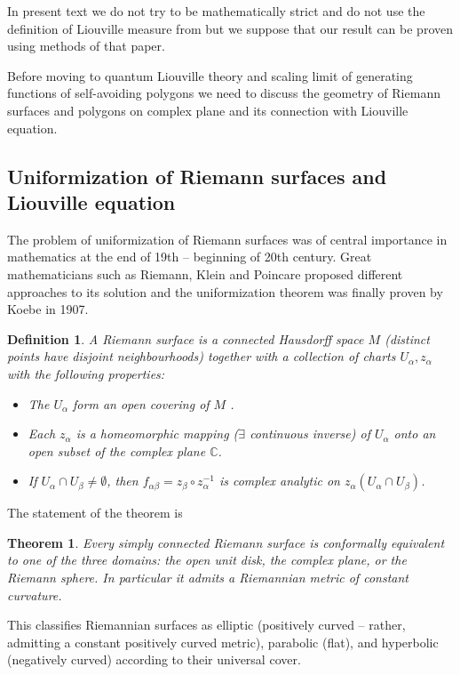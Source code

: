 \documentclass[12pt]{article}
\newtheorem{theorem}{Theorem}
\newtheorem{definition}{Definition}
\begin{document}
In present text we do not try to be mathematically strict and do not use the definition of Liouville
measure from \cite{duplantier2011liouville} but we suppose that our result can be proven using
methods of that paper.

Before moving to quantum Liouville theory and scaling limit of generating functions of self-avoiding
polygons we need to discuss the geometry of Riemann surfaces and polygons on complex plane and its
connection with Liouville equation. 

\subsection{Uniformization of Riemann surfaces and Liouville equation}
\label{sec:unif-riem-surf}

The problem of uniformization of Riemann surfaces was of central importance in mathematics at the
end of 19th -- beginning of 20th century. Great mathematicians such as Riemann, Klein and Poincare
proposed different approaches to its solution and the uniformization theorem was finally proven by
Koebe in 1907. 

\begin{definition}
  A Riemann surface is a connected Hausdorff space $M$ (distinct points have disjoint neighbourhoods) together with a collection
  of charts ${U_{\alpha} , z_{\alpha} }$ with the following properties:
  \begin{itemize}
  \item The $U_{\alpha}$ form an open covering of $M$ .
  \item Each $z_{\alpha}$ is a homeomorphic mapping ($\exists$ continuous inverse) of $U_{\alpha}$ onto an open subset of the complex plane $\mathbb{C}$.
  \item If $U_{\alpha}\cap  U_{\beta} \neq \emptyset$, then $f_{\alpha\beta} = z_{\beta}\circ  z_{\alpha}^{-1}$ is complex analytic on $z_{\alpha} (U_{\alpha} \cap U_{\beta} )$.
  \end{itemize}  
\end{definition}

The statement of the theorem is 
\begin{theorem}
  Every simply connected Riemann surface is conformally equivalent to one of the three domains: the
  open unit disk, the complex plane, or the Riemann sphere. In particular it admits a Riemannian
  metric of constant curvature.
\end{theorem} 

This classifies Riemannian surfaces as elliptic (positively curved -- rather, admitting a constant
positively curved metric), parabolic (flat), and hyperbolic (negatively curved) according to their
universal cover.
\end{document}
